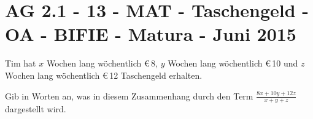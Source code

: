 \section{AG 2.1 - 13 - MAT - Taschengeld - OA - BIFIE - Matura - Juni 2015}

\begin{beispiel}[AG 2.1]{1} %
Tim hat $x$ Wochen lang wöchentlich \euro\,8, $y$ Wochen lang wöchentlich \euro\,10 und $z$ Wochen lang
wöchentlich \euro\,12 Taschengeld erhalten. \leer

Gib in Worten an, was in diesem Zusammenhang durch den Term $\frac{8x + 10y +12z}{x+y+z}$ dargestellt wird.

\end{beispiel}